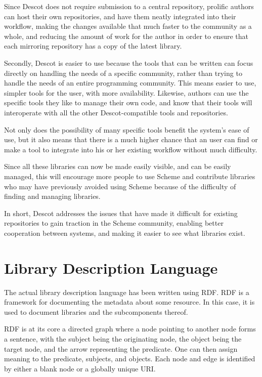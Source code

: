 Since Descot does not require submission to a central 
repository, prolific authors can host their own repositories, 
and have them neatly integrated into their workflow, 
making the changes available that much faster to the 
community as a whole, and reducing the amount of work for 
the author in order to ensure that each mirroring
repository has a copy of the latest library.

Secondly, Descot is easier to use because the tools 
that can be written can focus directly on handling the 
needs of a specific community, rather than trying to 
handle the needs of an entire programming community. 
This means easier to use, simpler tools for the 
user, with more availability. Likewise, authors can 
use the specific tools they like to manage their own 
code, and know that their tools will interoperate with 
all the other Descot-compatible tools and repositories. 

Not only does the possibility of many specific tools 
benefit the system's ease of use, but it also means that 
there is a much higher chance that an user can find or 
make a tool to integrate into his or her existing workflow
without much difficulty. 

Since all these libraries can now be made easily visible, 
and can be easily managed, this will encourage more 
people to use Scheme and contribute libraries who may have 
previously avoided using Scheme because of the difficulty 
of finding and managing libraries. 

In short, Descot addresses the issues that have made it difficult 
for existing repositories to gain traction in the Scheme community, 
enabling better cooperation between systems, and making it easier 
to see what libraries exist. 

\section{Library Description Language}

The actual library description language has been written using RDF\cite{rdf}. 
RDF is a framework for documenting the metadata about some resource. 
In this case, it is used to document libraries and the subcomponents 
thereof. 

RDF is at its core a directed graph where a node 
pointing to another node forms a sentence, with the subject being 
the originating node, the object being the target node, and 
the arrow representing the predicate. One can then assign 
meaning to the predicate, subjects, and objects. Each node and 
edge is identified by either a blank node or a globally unique 
URI. \cite{rdfprimer} 

